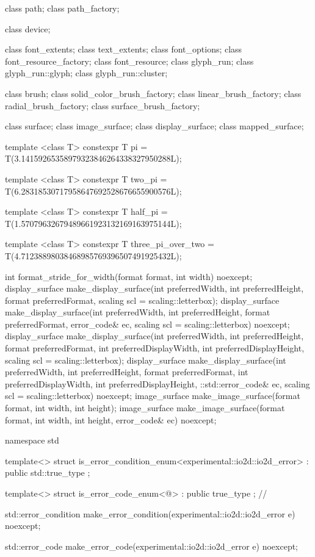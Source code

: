 \begin{codeblock}
{{{{  class path;
  class path_factory;
  
  class device;

  class font_extents;
  class text_extents;
  class font_options;
  class font_resource_factory;
  class font_resource;
  class glyph_run;
  class glyph_run::glyph;
  class glyph_run::cluster;

  class brush;
  class solid_color_brush_factory;
  class linear_brush_factory;
  class radial_brush_factory;
  class surface_brush_factory;
  
  class surface;
  class image_surface;
  class display_surface;
  class mapped_surface;
  
  template <class T>
  constexpr T pi = T(3.14159265358979323846264338327950288L);
  
  template <class T>
  constexpr T two_pi = T(6.28318530717958647692528676655900576L);
  
  template <class T>
  constexpr T half_pi = T(1.57079632679489661923132169163975144L);
  
  template <class T>
  constexpr T three_pi_over_two = T(4.71238898038468985769396507491925432L);
  
  int format_stride_for_width(format format, int width) noexcept;
  display_surface make_display_surface(int preferredWidth,
    int preferredHeight, format preferredFormat,
    scaling scl = scaling::letterbox);
  display_surface make_display_surface(int preferredWidth,
    int preferredHeight, format preferredFormat, error_code& ec,
    scaling scl = scaling::letterbox) noexcept;
  display_surface make_display_surface(int preferredWidth,
    int preferredHeight, format preferredFormat, int preferredDisplayWidth, 
    int preferredDisplayHeight, scaling scl = scaling::letterbox);
  display_surface make_display_surface(int preferredWidth,
    int preferredHeight, format preferredFormat, int preferredDisplayWidth, 
    int preferredDisplayHeight, ::std::error_code& ec,
    scaling scl = scaling::letterbox) noexcept;
  image_surface make_image_surface(format format, int width, int height);
  image_surface make_image_surface(format format, int width, int height, 
    error_code& ec) noexcept;
} } } }

namespace std {
  template<>
  struct is_error_condition_enum<experimental::io2d::io2d_error>
    : public std::true_type{ };

  template<>
  struct is_error_code_enum<@\impdef@>
    : public true_type{ }; // \expos

  std::error_condition make_error_condition(experimental::io2d::io2d_error e) 
    noexcept;

  std::error_code make_error_code(experimental::io2d::io2d_error e) noexcept;
}

\end{codeblock}
%
